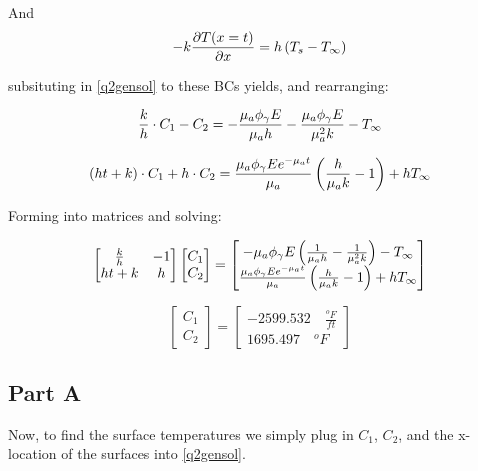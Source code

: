 \documentclass{article}
\begin{document}
And 
\begin{equation}
    -k \frac{\partial T(x=t)}{\partial x} = h \left(T_s - T_{\infty}\right)
\end{equation}

subsituting in \eqref{q2gensol} to these BCs yields, and rearranging:

\begin{equation}
    \frac{k}{h} \cdot C_1 - C_2 = -\frac{\mu_a \phi_{\gamma} E}{\mu_a h} - \frac{\mu_a \phi_{\gamma} E}{\mu_a^2 k} - T_{\infty}
\end{equation}

\begin{equation}
    \left( h t + k \right) \cdot C_1+ h \cdot C_2 = \frac{\mu_a \phi_{\gamma} E e^{-\mu_a t}}{\mu_a} \left( \frac{h}{\mu_a k} - 1\right) + h T_{\infty}
\end{equation}

Forming into matrices and solving:

\begin{equation}
    \begin{bmatrix}
    \frac{k}{h} & -1 \\
    h t + k & h
    \end{bmatrix} 
    \begin{bmatrix}
        C_1 \\
        C_2
    \end{bmatrix}
    =
    \begin{bmatrix}
        -\mu_a \phi_{\gamma} E\left(\frac{1}{\mu_a h} - \frac{1}{\mu_a^2 k}\right) - T_{\infty} \\
        \frac{\mu_a \phi_{\gamma} E e^{-\mu_a t}}{\mu_a} \left( \frac{h}{\mu_a k} - 1\right) + h T_{\infty}
    \end{bmatrix}
\end{equation}

\begin{equation}
    \begin{bmatrix}
        C_1 \\ C_2
    \end{bmatrix}
     = 
     \begin{bmatrix}
         -2599.532 \quad \frac{^oF}{ft}\\ 1695.497  \quad ^oF
     \end{bmatrix}
\end{equation}


\subsection{Part A}
Now, to find the surface temperatures we simply plug in $C_1$, $C_2$, and the x-location of the surfaces into \eqref{q2gensol}. 
\end{document}
